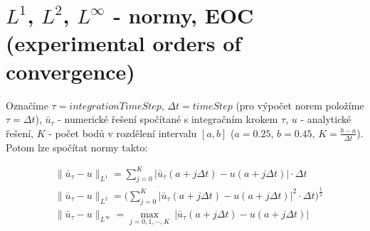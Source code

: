 \documentclass[11pt,american,czech]{article}
\begin{document}
\newpage

\section{$L^{1}$, $L^{2}$, $L^{\infty}$ - normy, EOC (experimental orders of convergence)}

Označíme $\tau = integrationTimeStep$, $\Delta t = timeStep$ (pro výpočet norem položíme $\tau = \Delta t$), $\bar{u}_{\tau}$ - numerické řešení spočítané s integračním krokem $\tau$, $u$ - analytické řešení, $K$ - počet bodů v rozdělení intervalu $[a, b]$ ($a=0.25$, $b=0.45$, $K = \tfrac{b-a}{\Delta t}$). Potom lze spočítat normy takto:

\begin{equation*}
	\begin{split}
		&\rVert\bar{u}_{\tau}-u\lVert_{L^{1}} = \sum_{j=0}^{K}\lvert\bar{u}_{\tau}(a+j\Delta t)-u(a+j\Delta t)\rvert\cdot\Delta t \\
		&\rVert\bar{u}_{\tau}-u\lVert_{L^{2}} = \Big(\sum_{j=0}^{K}\lvert\bar{u}_{\tau}(a+j\Delta t)-u(a+j\Delta t)\rvert^{2}\cdot\Delta t\Big)^{\frac{1}{2}} \\
		&\rVert\bar{u}_{\tau}-u\lVert_{L^{\infty}} = \max_{j=0,1,\cdots,K}\  \lvert\bar{u}_{\tau}(a+j\Delta t)-u(a+j\Delta t)\rvert 
	\end{split}
\end{equation*}
\end{document}
